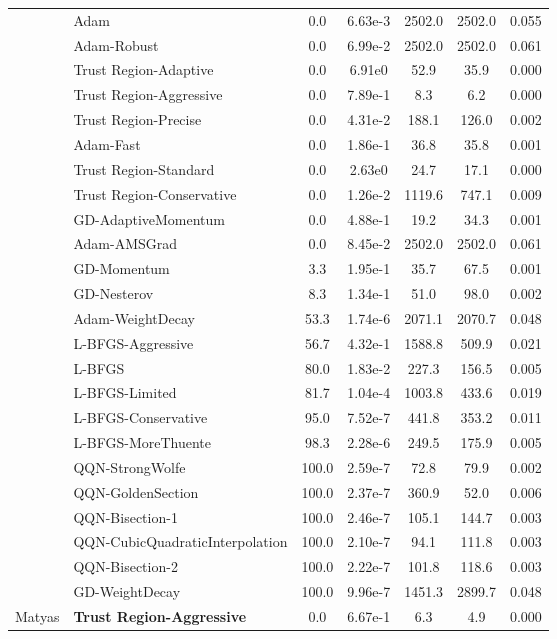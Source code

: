 \documentclass{article}
\begin{document}
\begin{table}[htbp]
{\begin{tabular}{p{2.5cm}p{2.5cm}*{5}{c}}
 & Adam & 0.0 & 6.63e-3 & 2502.0 & 2502.0 & 0.055 \\
 & Adam-Robust & 0.0 & 6.99e-2 & 2502.0 & 2502.0 & 0.061 \\
 & Trust Region-Adaptive & 0.0 & 6.91e0 & 52.9 & 35.9 & 0.000 \\
 & Trust Region-Aggressive & 0.0 & 7.89e-1 & 8.3 & 6.2 & 0.000 \\
 & Trust Region-Precise & 0.0 & 4.31e-2 & 188.1 & 126.0 & 0.002 \\
 & Adam-Fast & 0.0 & 1.86e-1 & 36.8 & 35.8 & 0.001 \\
 & Trust Region-Standard & 0.0 & 2.63e0 & 24.7 & 17.1 & 0.000 \\
 & Trust Region-Conservative & 0.0 & 1.26e-2 & 1119.6 & 747.1 & 0.009 \\
 & GD-AdaptiveMomentum & 0.0 & 4.88e-1 & 19.2 & 34.3 & 0.001 \\
 & Adam-AMSGrad & 0.0 & 8.45e-2 & 2502.0 & 2502.0 & 0.061 \\
 & GD-Momentum & 3.3 & 1.95e-1 & 35.7 & 67.5 & 0.001 \\
 & GD-Nesterov & 8.3 & 1.34e-1 & 51.0 & 98.0 & 0.002 \\
 & Adam-WeightDecay & 53.3 & 1.74e-6 & 2071.1 & 2070.7 & 0.048 \\
 & L-BFGS-Aggressive & 56.7 & 4.32e-1 & 1588.8 & 509.9 & 0.021 \\
 & L-BFGS & 80.0 & 1.83e-2 & 227.3 & 156.5 & 0.005 \\
 & L-BFGS-Limited & 81.7 & 1.04e-4 & 1003.8 & 433.6 & 0.019 \\
 & L-BFGS-Conservative & 95.0 & 7.52e-7 & 441.8 & 353.2 & 0.011 \\
 & L-BFGS-MoreThuente & 98.3 & 2.28e-6 & 249.5 & 175.9 & 0.005 \\
 & QQN-StrongWolfe & 100.0 & 2.59e-7 & 72.8 & 79.9 & 0.002 \\
 & QQN-GoldenSection & 100.0 & 2.37e-7 & 360.9 & 52.0 & 0.006 \\
 & QQN-Bisection-1 & 100.0 & 2.46e-7 & 105.1 & 144.7 & 0.003 \\
 & QQN-CubicQuadraticInterpolation & 100.0 & 2.10e-7 & 94.1 & 111.8 & 0.003 \\
 & QQN-Bisection-2 & 100.0 & 2.22e-7 & 101.8 & 118.6 & 0.003 \\
 & GD-WeightDecay & 100.0 & 9.96e-7 & 1451.3 & 2899.7 & 0.048 \\
\midrule
\multirow{25}{*}{Matyas} & \textbf{Trust Region-Aggressive} & 0.0 & 6.67e-1 & 6.3 & 4.9 & 0.000 \\

\end{tabular}}
\end{table}
\end{document}
